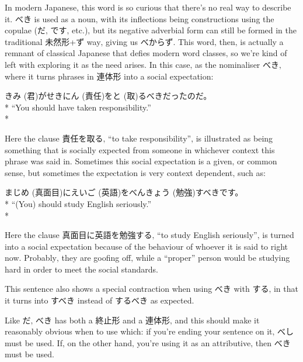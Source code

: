 \documentclass[11pt, b5paper, twoside, openright, onecolumn]{book}
\makeatletter
\newcommand*{\rubystack}[2]{{\relscale{0.5}%
  \begin{tabular}[b]{@{}c@{}}%
    {#1}\\%
   {\textscale{2}{#2}}%
  \end{tabular}}%
}
\DeclareRobustCommand*{\ruby}[2]{%
  \mbox{%
    \setlength{\parskip}{0ex}%
    \BeginAccSupp{method=pdfstringdef,ActualText={#1}}%
      \rubystack{\phantom{#2}}{#1}%
      \llap{%
        \rubystack{#2}{\phantom{#1}}%
      }%
    \EndAccSupp{}%
  }%
}
\renewcommand*{\ruby}[2]{#2 (#1)}%
\newenvironment{exampleblock}{
\setlength{\parindent}{0.6in}
\begin{minipage}[t]{\dimexpr\textwidth-\parindent}}
{\end{minipage}}
\makeatother
\begin{document}
In modern Japanese‚ this word is so curious that there’s no real way to describe it. べき is used as a noun‚ with its inflections being constructions using the copulae (だ‚ です‚ etc.)‚ but its negative adverbial form can still be formed in the traditional 未然形+ず way‚ giving us べからず. This word‚ then‚ is actually a remnant of classical Japanese that defies modern word classes‚ so we’re kind of left with exploring it as the need arises. In this case‚ as the nominaliser べき‚ where it turns phrases in 連体形 into a social expectation:

\vspace{0.4cm}
\begin{exampleblock}
\ruby{君}{きみ}が\ruby{責任}{せきにん}を\ruby{取}{と}るべきだったのだ。 \\* 
“You should have taken responsibility.” \\* 
\end{exampleblock}
\vspace{0.2cm}

Here the clause 責任を取る‚ “to take responsibility”‚ is illustrated as being something that is socially expected from someone in whichever context this phrase was said in. Sometimes this social expectation is a given‚ or common sense‚ but sometimes the expectation is very context dependent‚ such as:

\vspace{0.4cm}
\begin{exampleblock}
\ruby{真面目}{まじめ}に\ruby{英語}{えいご}を\ruby{勉強}{べんきょう}すべきです。 \\* 
“(You) should study English seriously.” \\* 
\end{exampleblock}
\vspace{0.2cm}

Here the clause 真面目に英語を勉強する‚ “to study English seriously”‚ is turned into a social expectation because of the behaviour of whoever it is said to right now. Probably‚ they are goofing off‚ while a “proper” person would be studying hard in order to meet the social standards.

This sentence also shows a special contraction when using べき with する‚ in that it turns into すべき instead of するべき as expected.

Like だ‚ べき has both a 終止形 and a 連体形‚ and this should make it reasonably obvious when to use which: if you’re ending your sentence on it‚ べし must be used. If‚ on the other hand‚ you’re using it as an attributive‚ then べき must be used.
\end{document}
